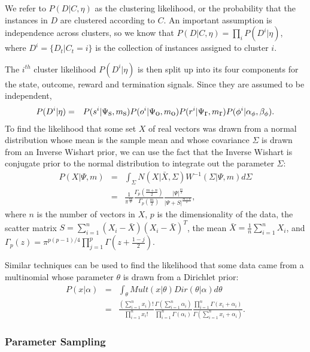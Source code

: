 We refer to $P(D|C, \eta)$ as the clustering likelihood, or the probability that the instances in $D$ are clustered according to $C$. An important assumption is independence across clusters, so we know that $P(D|C,\eta) = \prod_i P(D^i|\eta)$, where $D^i=\{D_t|C_t=i\}$ is the collection of instances assigned to cluster $i$.

The $i^{th}$ cluster likelihood $P(D^i|\eta)$ is then split up into its four components for the state, outcome, reward and termination signals. Since they are assumed to be independent, 
\begin{eqnarray*}
P(D^i|\eta)&=&P(s^i|\Psi_{\mbox s},m_{\mbox s})P(o^i|\Psi_{\mbox o},m_{\mbox o})P(r^i|\Psi_{\mbox r},m_{\mbox r})P(\phi^i|\alpha_\phi,\beta_\phi).
\end{eqnarray*}
To find the likelihood that some set $X$ of real vectors was drawn from a normal distribution whose mean is the sample mean and whose covariance $\Sigma$ is drawn from an Inverse Wishart prior, we can use the fact that the Inverse Wishart is conjugate prior to the normal distribution to integrate out the parameter $\Sigma$:
\begin{eqnarray}
\nonumber P(X|\Psi,m)&=&\int_\Sigma N(X|\bar X,\Sigma)W^{-1}(\Sigma|\Psi,m)d\Sigma\\
&=&\frac{1}{\pi^{\frac{np}{2}}}
\frac{\Gamma_p\left(\frac{m+n}{2}\right)}{\Gamma_p(\frac{m}{2})}
\frac{|\Psi|^{\frac{m}{2}}}{|\Psi+S|^{\frac{m+n}{2}}},\label{eq:iw}
\end{eqnarray}
where $n$ is the number of vectors in $X$, $p$ is the dimensionality of the data, the scatter matrix $S=\sum_{i=1}^n(X_i-\bar X)(X_i-\bar X)^T$, the mean $\bar X=\frac 1 n \sum_{i=1}^n X_i$, and $\Gamma_p(z)=\pi^{p(p-1)/4}\prod_{j=1}^p\Gamma\left(z+\frac {1-j} 2\right)$.

Similar techniques can be used to find the likelihood that some data came from a multinomial whose parameter $\theta$ is drawn from a Dirichlet prior:
\begin{eqnarray*}
P(x|\alpha) &=& \int_\theta Mult(x|\theta)Dir(\theta|\alpha)d\theta\\
&=&\frac{(\sum_{i=1}^n x_i)!}{\prod_{i=1}^n x_i!} \frac{\Gamma(\sum_{i=1}^n \alpha_i)}{\prod_{i=1}^n\Gamma(\alpha_i)} \frac{\prod_{i=1}^n\Gamma(x_i+\alpha_i)}{\Gamma(\sum_{i=1}^n x_i+\alpha_i)}.
\end{eqnarray*}
\subsubsection{Parameter Sampling}

